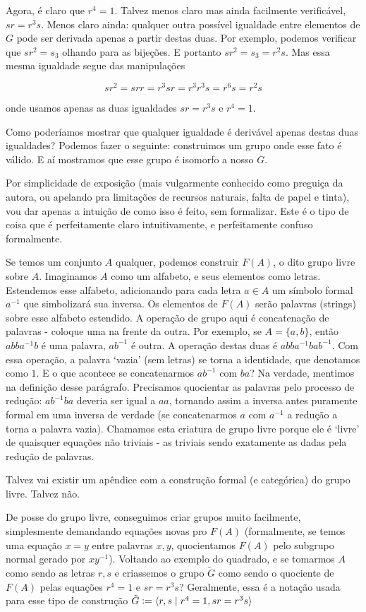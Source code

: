 \documentclass[11pt]{article}
\newcommand{\defeq}{\vcentcolon=}
\theoremstyle{definition}
\theoremstyle{definition}
\theoremstyle{definition}
\theoremstyle{definition}
\theoremstyle{definition}
\theoremstyle{definition}
\theoremstyle{definition}
\theoremstyle{definition}
\theoremstyle{definition}
\theoremstyle{definition}
\theoremstyle{definition}
\theoremstyle{definition}
\theoremstyle{definition}
\begin{document}
Agora, é claro que $r^4 = 1$. Talvez menos claro mas ainda facilmente verificável, $sr = r^3s$. Menos claro ainda: qualquer outra possível igualdade entre elementos de $G$ pode ser derivada apenas a partir destas duas. Por exemplo, podemos verificar que $sr^2= s_3$ olhando para as bijeções. E portanto $sr^2 = s_3 = r^2s$. Mas essa mesma igualdade segue das manipulações

\[
sr^2 = srr = r^3sr = r^3r^3s = r^6s = r^2s
\]

onde usamos apenas as duas igualdades $sr = r^3s$ e $r^4 = 1$.

Como poderíamos mostrar que qualquer igualdade é derivável apenas destas duas igualdades? Podemos fazer o seguinte: construimos um grupo onde esse fato é válido. E aí mostramos que esse grupo é isomorfo a nosso $G$.

Por simplicidade de exposição (mais vulgarmente conhecido como preguiça da autora, ou apelando pra limitações de recursos naturais, falta de papel e tinta), vou dar apenas a intuição de como isso é feito, sem formalizar. Este é o tipo de coisa que é perfeitamente claro intuitivamente, e perfeitamente confuso formalmente.

Se temos um conjunto $A$ qualquer, podemos construir $F(A)$, o dito grupo livre sobre $A$. Imaginamos $A$ como um alfabeto, e seus elementos como letras. Estendemos esse alfabeto, adicionando para cada letra $a \in A$ um símbolo formal $a^{-1}$ que simbolizará sua inversa. Os elementos de $F(A)$ serão palavras (strings) sobre esse alfabeto estendido. A operação de grupo aqui é concatenação de palavras - coloque uma na frente da outra. Por exemplo, se $A = \{a,b\}$, então $abba^{-1}b$ é uma palavra, $ab^{-1}$ é outra. A operação destas duas é $abba^{-1}bab^{-1}$. Com essa operação, a palavra `vazia' (sem letras) se torna a identidade, que denotamos como $1$. E o que acontece se concatenarmos $ab^{-1}$ com $ba$? Na verdade, mentimos na definição desse parágrafo. Precisamos quocientar as palavras pelo processo de redução: $ab^{-1}ba$ deveria ser igual a $aa$, tornando assim a inversa antes puramente formal em uma inversa de verdade (se concatenarmos $a$ com $a^{-1}$ a redução a torna a palavra vazia).  Chamamos esta criatura de grupo livre porque ele é `livre' de quaisquer equações não triviais - as triviais sendo exatamente as dadas pela redução de palavras.

Talvez vai existir um apêndice com a construção formal (e categórica) do grupo livre. Talvez não.

De posse do grupo livre, conseguimos criar grupos muito facilmente, simplesmente demandando equações novas pro $F(A)$ (formalmente, se temos uma equação $x = y$ entre palavras $x,y$, quocientamos $F(A)$ pelo subgrupo normal gerado por $xy^{-1}$). Voltando ao exemplo do quadrado, e se tomarmos $A$ como sendo as letras $r,s$ e criassemos o grupo $\tilde{G}$ como sendo o quociente de $F(A)$ pelas equações $r^4 = 1$ e $sr = r^3s$? Geralmente, essa é a notação usada para esse tipo de construção $\tilde{G} \defeq \langle r,s \mid r^4 = 1, sr = r^3s \rangle$
\end{document}
